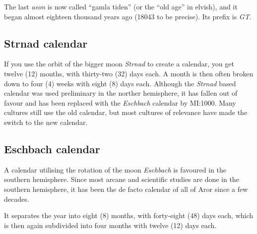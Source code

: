 The last \emph{aeon} is now called ``gamla tiden'' (or the ``old age''
in elvish), and it began almost eighteen thousand years ago (18043 to
be precise). Its prefix is \emph{GT}.

\subsection{Strnad calendar}

If you use the orbit of the bigger moon \emph{Strnad} to create a
calendar, you get twelve (12) months, with thirty-two (32) days
each. A month is then often broken down to four (4) weeks with eight
(8) days each. Although the \emph{Strnad} based calendar was used
preliminary in the norther hemisphere, it has fallen out of favour and
has been replaced with the \emph{Eschbach} calendar by MI:1000. Many
cultures still use the old calendar, but most cultures of relevance
have made the switch to the new calendar.

\subsection{Eschbach calendar}

A calendar utilising the rotation of the moon \emph{Eschbach} is favoured
in the southern hemisphere. Since most arcane and scientific studies are
done in the southern hemisphere, it has been the de facto calendar of all
of Aror since a few decades.

It separates the year into eight (8) months, with forty-eight (48) days
each, which is then again subdivided into four months with twelve (12)
days each.
